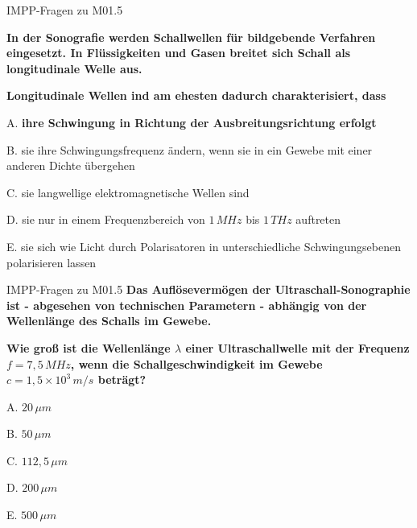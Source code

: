 \documentclass{beamer}
\begin{document}
\begin{frame}{IMPP-Fragen zu M01.5}
    
    \textbf{In der Sonografie werden Schallwellen für bildgebende Verfahren eingesetzt. In Flüssigkeiten und Gasen breitet sich Schall als longitudinale Welle aus.}
    
    \textbf{
    Longitudinale Wellen ind am ehesten dadurch charakterisiert, dass 
    } \\[0.2 cm]

\begin{description}
\item{A.} \textcolor{theme}{\textbf{ihre Schwingung in Richtung der Ausbreitungsrichtung erfolgt}}
\item{B.} sie ihre Schwingungsfrequenz ändern, wenn sie in ein Gewebe mit einer anderen Dichte übergehen
\item{C.} sie langwellige elektromagnetische Wellen sind
\item{D.} sie nur in einem Frequenzbereich von \(1\,MHz\) bis \(1\,THz\) auftreten
\item{E.} sie sich wie Licht durch Polarisatoren in unterschiedliche Schwingungsebenen polarisieren lassen

\end{description}
    
\end{frame}





 


\begin{frame}{IMPP-Fragen zu M01.5}
\textbf{Das Auflösevermögen der Ultraschall-Sonographie ist - abgesehen von technischen Parametern - abhängig von der Wellenlänge des Schalls im Gewebe.}

\textbf{
Wie groß ist die Wellenlänge \(\lambda\) einer Ultraschallwelle mit der Frequenz \(f=7,5\,MHz\), wenn die Schallgeschwindigkeit im Gewebe \(c=1,5\times 10^3\,m/s\) beträgt?} \\[0.2 cm]

\begin{description}
\item{A.} \(20\,\mu m\)
\item{B.} \(50\,\mu m\)
\item{C.} \(112,5\,\mu m\)
\item{D.} \(200\,\mu m\) %
\item{E.} \(500\,\mu m\)

\end{description}
\end{frame}
\end{document}
